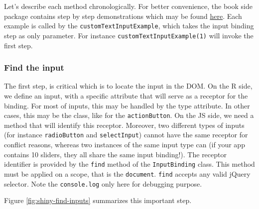 \documentclass[
]{book}
\newenvironment{Shaded}{\begin{snugshade}}{\end{snugshade}}
\newcommand{\AttributeTok}[1]{\textcolor[rgb]{0.77,0.63,0.00}{#1}}
\newcommand{\ControlFlowTok}[1]{\textcolor[rgb]{0.13,0.29,0.53}{\textbf{#1}}}
\newcommand{\KeywordTok}[1]{\textcolor[rgb]{0.13,0.29,0.53}{\textbf{#1}}}
\newcommand{\NormalTok}[1]{#1}
\newcommand{\OperatorTok}[1]{\textcolor[rgb]{0.81,0.36,0.00}{\textbf{#1}}}
\newcommand{\StringTok}[1]{\textcolor[rgb]{0.31,0.60,0.02}{#1}}
\newcommand{\VariableTok}[1]{\textcolor[rgb]{0.00,0.00,0.00}{#1}}
\begin{document}
Let's describe each method chronologically. For better convenience, the book side package contains step by step demonstrations which may be found \href{https://github.com/DivadNojnarg/outstanding-shiny-ui-code/blob/master/R/inputs.R}{here}. Each example is called by the \texttt{customTextInputExample}, which takes the input binding step as only parameter. For instance \texttt{customTextInputExample(1)} will invoke the first step.

\hypertarget{find-the-input}{%
\subsubsection{Find the input}\label{find-the-input}}

The first step, is critical which is to locate the input in the DOM. On the R side, we define an input, with a specific attribute that will serve as a receptor for the binding. For most of inputs, this may be handled by the type attribute. In other cases, this may be the class, like for the \texttt{actionButton}. On the JS side, we need a method that will identify this receptor. Moreover, two different types of inputs (for instance \texttt{radioButton} and \texttt{selectInput}) cannot have the same receptor for conflict reasons, whereas two instances of the same input type can (if your app contains 10 sliders, they all share the same input binding!). The receptor identifier is provided by the \texttt{find} method of the \texttt{InputBinding} class. This method must be applied on a scope, that is the \texttt{document}. \texttt{find} accepts any valid jQuery selector. Note the \texttt{console.log} only here for debugging purpose.

\begin{Shaded}
\end{Shaded}

Figure \ref{fig:shiny-find-inputs} summarizes this important step.
\end{document}

